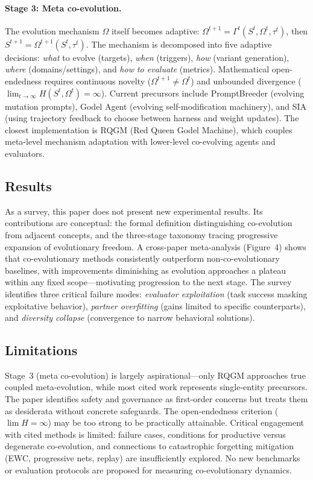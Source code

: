 \documentclass[11pt,a4paper]{article}
\begin{document}
\paragraph{Stage 3: Meta co-evolution.} The evolution mechanism $\Omega$ itself becomes adaptive: $\Omega^{t+1} = \Gamma^t(S^t, \Omega^t, \tau^t)$, then $S^{t+1} = \Omega^{t+1}(S^t, \tau^t)$. The mechanism is decomposed into five adaptive decisions: \emph{what} to evolve (targets), \emph{when} (triggers), \emph{how} (variant generation), \emph{where} (domains/settings), and \emph{how to evaluate} (metrics). Mathematical open-endedness requires continuous novelty ($\Omega^{t+1} \neq \Omega^t$) and unbounded divergence ($\lim_{t \to \infty} H(S^t, \Omega^t) = \infty$). Current precursors include PromptBreeder (evolving mutation prompts), Godel Agent (evolving self-modification machinery), and SIA (using trajectory feedback to choose between harness and weight updates). The closest implementation is RQGM (Red Queen Godel Machine), which couples meta-level mechanism adaptation with lower-level co-evolving agents and evaluators.

\subsection{Results}

As a survey, this paper does not present new experimental results. Its contributions are conceptual: the formal definition distinguishing co-evolution from adjacent concepts, and the three-stage taxonomy tracing progressive expansion of evolutionary freedom. A cross-paper meta-analysis (Figure~4) shows that co-evolutionary methods consistently outperform non-co-evolutionary baselines, with improvements diminishing as evolution approaches a plateau within any fixed scope---motivating progression to the next stage. The survey identifies three critical failure modes: \emph{evaluator exploitation} (task success masking exploitative behavior), \emph{partner overfitting} (gains limited to specific counterparts), and \emph{diversity collapse} (convergence to narrow behavioral solutions).

\subsection{Limitations}

Stage~3 (meta co-evolution) is largely aspirational---only RQGM approaches true coupled meta-evolution, while most cited work represents single-entity precursors. The paper identifies safety and governance as first-order concerns but treats them as desiderata without concrete safeguards. The open-endedness criterion ($\lim H = \infty$) may be too strong to be practically attainable. Critical engagement with cited methods is limited: failure cases, conditions for productive versus degenerate co-evolution, and connections to catastrophic forgetting mitigation (EWC, progressive nets, replay) are insufficiently explored. No new benchmarks or evaluation protocols are proposed for measuring co-evolutionary dynamics.
\end{document}
